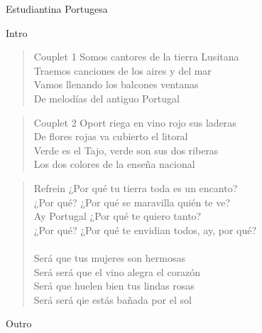 \begin{song}{Estudiantina Portugesa}

\begin{instrumental}{Intro}
 \measure{} \measure{} \measure{} \measure{} \measure{} \measure{} \measure{}
\measure{} \measure{} \measure{} \measure{}  \measure{} \measure{} \measure{}
\measure{} \measure{} \measure{} \measure{} \measure{} \measure{} \measure{} \measure{}
\measure{} \measure{} \measure{} \measure{}  
\end{instrumental}

\begin{verse}{Couplet 1}
    Somos cantores de la tierra Lusitana\\
    Traemos canciones de los aires y del mar\\
    Vamos llenando los balcones ventanas\\
    De melod\'ias del antiguo Portugal
\end{verse}

\begin{verse}{Couplet 2}
    Oport riega en vino rojo sus laderas\\
    De flores rojas va cubierto el litoral\\
    Verde es el Tajo, verde son sus dos riberas\\
    Los dos colores de la ense\~na nacional
\end{verse}

\begin{verse}{Refrein}
    ¿Por qu\'e tu tierra toda es un encanto?\\
    ¿Por qu\'e? ¿Por qu\'e se maravilla qui\'en te ve?\\
    Ay Portugal ¿Por qu\'e te quiero tanto?\\
    ¿Por qu\'e? ¿Por qu\'e te envidian todos, ay, por qu\'e?\\
    \\
    Ser\'a que tus mujeres son hermosas\\
    Ser\'a ser\'a que el vino alegra el coraz\'on\\
    Ser\'a que huelen bien tus lindas rosas\\
    Ser\'a ser\'a qie est\'as ba\~nada por el sol
\end{verse}

\begin{instrumental}{Outro}
    \measure{}  \measure{}  \measure{}  \measure{} 
\end{instrumental}
\end{song}
